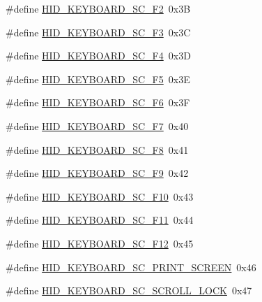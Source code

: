 \begin{DoxyCompactItemize}
\#define \hyperlink{group__Group__USBClassHIDCommon_ga9736ecc40c772397a659a184f0e4cc3e}{H\+I\+D\+\_\+\+K\+E\+Y\+B\+O\+A\+R\+D\+\_\+\+S\+C\+\_\+\+F2}~0x3B
\item 
\#define \hyperlink{group__Group__USBClassHIDCommon_ga174ece627a56f6481d6bc92bf3c32354}{H\+I\+D\+\_\+\+K\+E\+Y\+B\+O\+A\+R\+D\+\_\+\+S\+C\+\_\+\+F3}~0x3C
\item 
\#define \hyperlink{group__Group__USBClassHIDCommon_ga852b28f3b9fd6597e072a7578a2a0587}{H\+I\+D\+\_\+\+K\+E\+Y\+B\+O\+A\+R\+D\+\_\+\+S\+C\+\_\+\+F4}~0x3D
\item 
\#define \hyperlink{group__Group__USBClassHIDCommon_ga3c20f17b0d0c22debbf9404f3dcf5164}{H\+I\+D\+\_\+\+K\+E\+Y\+B\+O\+A\+R\+D\+\_\+\+S\+C\+\_\+\+F5}~0x3E
\item 
\#define \hyperlink{group__Group__USBClassHIDCommon_ga91ec879540f0c6d33112e4f8e0b29004}{H\+I\+D\+\_\+\+K\+E\+Y\+B\+O\+A\+R\+D\+\_\+\+S\+C\+\_\+\+F6}~0x3F
\item 
\#define \hyperlink{group__Group__USBClassHIDCommon_gab213c685f4e0b10a4d10da83996d531d}{H\+I\+D\+\_\+\+K\+E\+Y\+B\+O\+A\+R\+D\+\_\+\+S\+C\+\_\+\+F7}~0x40
\item 
\#define \hyperlink{group__Group__USBClassHIDCommon_gabf00f14610d4acd2384aea051ef6d4c6}{H\+I\+D\+\_\+\+K\+E\+Y\+B\+O\+A\+R\+D\+\_\+\+S\+C\+\_\+\+F8}~0x41
\item 
\#define \hyperlink{group__Group__USBClassHIDCommon_gaf9ad98145888f884ec9333ca638d30e2}{H\+I\+D\+\_\+\+K\+E\+Y\+B\+O\+A\+R\+D\+\_\+\+S\+C\+\_\+\+F9}~0x42
\item 
\#define \hyperlink{group__Group__USBClassHIDCommon_ga486a1613e2977f90cc8e0792b2bbb3b3}{H\+I\+D\+\_\+\+K\+E\+Y\+B\+O\+A\+R\+D\+\_\+\+S\+C\+\_\+\+F10}~0x43
\item 
\#define \hyperlink{group__Group__USBClassHIDCommon_ga8478ca012d2762c884d2c3803e186a10}{H\+I\+D\+\_\+\+K\+E\+Y\+B\+O\+A\+R\+D\+\_\+\+S\+C\+\_\+\+F11}~0x44
\item 
\#define \hyperlink{group__Group__USBClassHIDCommon_ga2a7c2ee5b2fd4467c693a4449a09c275}{H\+I\+D\+\_\+\+K\+E\+Y\+B\+O\+A\+R\+D\+\_\+\+S\+C\+\_\+\+F12}~0x45
\item 
\#define \hyperlink{group__Group__USBClassHIDCommon_ga0fba091f27a3f14bae573872dc3be045}{H\+I\+D\+\_\+\+K\+E\+Y\+B\+O\+A\+R\+D\+\_\+\+S\+C\+\_\+\+P\+R\+I\+N\+T\+\_\+\+S\+C\+R\+E\+EN}~0x46
\item 
\#define \hyperlink{group__Group__USBClassHIDCommon_ga99e3ed5b24331ebf43d34c8226534139}{H\+I\+D\+\_\+\+K\+E\+Y\+B\+O\+A\+R\+D\+\_\+\+S\+C\+\_\+\+S\+C\+R\+O\+L\+L\+\_\+\+L\+O\+CK}~0x47

\end{DoxyCompactItemize}
